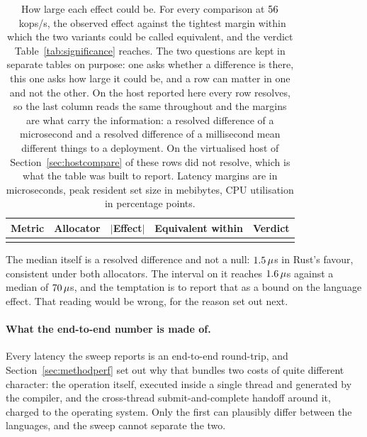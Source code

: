 \documentclass[english,oneside,a4paper,censored,csm,software-track-2020]{HYthesisML}
\begin{document}
\begin{table}[tp]
\centering
\small
\caption[How large each effect could be]{How large each effect could be. For every comparison at
$56$~kops/s, the observed effect against the tightest margin within which the two variants
could be called equivalent, and the verdict Table~\ref{tab:significance} reaches. The two
questions are kept in separate tables on purpose: one asks whether a difference is there, this one
asks how large it could be, and a row can matter in one and not the other. On the host reported
here every row resolves, so the last column reads the same throughout and the margins are what
carry the information: a resolved difference of a microsecond and a resolved difference of a
millisecond mean different things to a deployment. On the virtualised host of
Section~\ref{sec:hostcompare} \GuestNEqvUnresolved{} of these rows did not resolve, which is what the
table was built to report. Latency margins are in microseconds, peak resident set size in mebibytes,
CPU utilisation in percentage points.\label{tab:equivalence}}
\begin{tabular}{@{}l l r r l@{}}
\hline\hline
Metric & Allocator & $|$Effect$|$ & Equivalent within & Verdict \\
\hline
\\
\hline
\end{tabular}
\end{table}

The median itself is a resolved difference and not a null: $1.5\,\mu$s
in Rust's favour, consistent under both allocators. The interval on it reaches
$1.6\,\mu$s against a median of $70\,\mu$s, and the temptation is to report
that as a bound on the language effect. That reading would be wrong, for the reason set out
next.

\paragraph{What the end-to-end number is made of.}\label{sec:budget}
Every latency the sweep reports is an end-to-end round-trip, and
Section~\ref{sec:methodperf} set out why that bundles two costs of quite different character: the
operation itself, executed inside a single thread and generated by the compiler, and the
cross-thread submit-and-complete handoff around it, charged to the operating system. Only the
first can plausibly differ between the languages, and the sweep cannot separate the two.
\end{document}
